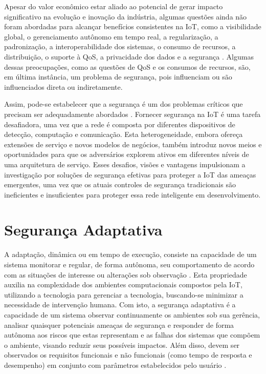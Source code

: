 \documentclass[tid,table]{texufpel} %
\begin{document}
Apesar do valor econômico estar aliado ao potencial de gerar impacto significativo na evolução e inovação da indústria, algumas questões ainda não foram abordadas para alcançar benefícios consistentes na IoT, como a visibilidade global, o gerenciamento autônomo em tempo real, a regularização, a padronização, a interoperabilidade dos sistemas, o consumo de recursos, a distribuição, o suporte à QoS, a privacidade dos dados e a segurança \cite{weber10, miorandi12}. Algumas dessas preocupações, como as questões de QoS e os consumos de recursos, são, em última instância, um problema de segurança, pois influenciam ou são influenciados direta ou indiretamente. 

Assim, pode-se estabelecer que a segurança é um dos problemas críticos que precisam ser adequadamente abordados \cite{miorandi12, roman13, sicari15}. Fornecer segurança na IoT é uma tarefa desafiadora, uma vez que a rede é composta por diferentes dispositivos de detecção, computação e comunicação. Esta heterogeneidade, embora ofereça extensões de serviço e novos modelos de negócios, também introduz novos meios e oportunidades para que os adversários explorem ativos em diferentes níveis de uma arquitetura de serviço. Esses desafios, visões e vantagens impulsionam a investigação por soluções de segurança efetivas para proteger a IoT das ameaças emergentes, uma vez que os atuais controles de segurança tradicionais são ineficientes e insuficientes para proteger essa rede inteligente em desenvolvimento.

\section{Segurança Adaptativa}

A adaptação, dinâmica ou em tempo de execução, consiste na capacidade de um sistema monitorar e regular, de forma autônoma, seu comportamento de acordo com as situações de interesse ou alterações sob observação \cite{ganek03, aman16}. Esta propriedade auxilia na complexidade dos ambientes computacionais compostos pela IoT, utilizando a tecnologia para gerenciar a tecnologia, buscando-se minimizar a necessidade de intervenção humana. Com isto, a segurança adaptativa é a capacidade de um sistema observar continuamente os ambientes sob sua gerência, analisar quaisquer potenciais ameaças de segurança e responder de forma autônoma aos riscos que estas representam e as falhas dos sistemas que compõem o ambiente, visando reduzir seus possíveis impactos. Além disso, devem ser observados os requisitos funcionais e não funcionais (como tempo de resposta e desempenho) em conjunto com parâmetros estabelecidos pelo usuário \cite{aman15}.
\end{document}
